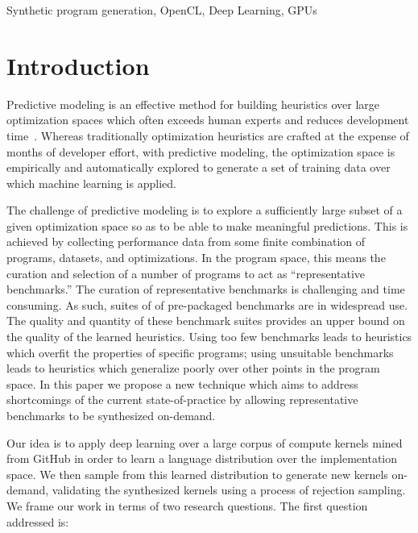 \documentclass[preprint,nonatbib,10pt,nocopyrightspace]{sigplanconf}
\begin{document}


\keywords
Synthetic program generation, %
OpenCL, %
Deep Learning, %
GPUs

\section{Introduction}\label{sec:introduction}

Predictive modeling is an effective method for building heuristics
over large optimization spaces which often exceeds human experts and
reduces development
time~\cite{Micolet2016,Wen2015,Magni2014,Falch2015,Cummins2016}. Whereas
traditionally optimization heuristics are crafted at the expense of
months of developer effort, with predictive modeling, the optimization
space is empirically and automatically explored to generate a set of
training data over which machine learning is applied.

The challenge of predictive modeling is to explore a sufficiently
large subset of a given optimization space so as to be able to make
meaningful predictions. This is achieved by collecting performance
data from some finite combination of programs, datasets, and
optimizations. In the program space, this means the curation and
selection of a number of programs to act as ``representative
benchmarks.'' The curation of representative benchmarks is challenging
and time consuming. As such, suites of of pre-packaged benchmarks are
in widespread use. The quality and quantity of these benchmark suites
provides an upper bound on the quality of the learned
heuristics. Using too few benchmarks leads to heuristics which overfit
the properties of specific programs; using unsuitable benchmarks leads
to heuristics which generalize poorly over other points in the program
space. In this paper we propose a new technique which aims to address
shortcomings of the current state-of-practice by allowing
representative benchmarks to be synthesized on-demand.

Our idea is to apply deep learning over a large corpus of compute
kernels mined from GitHub in order to learn a language distribution
over the implementation space. We then sample from this learned
distribution to generate new kernels on-demand, validating the
synthesized kernels using a process of rejection sampling.
%
We frame our work in terms of two research questions. The first
question addressed is:
\end{document}
